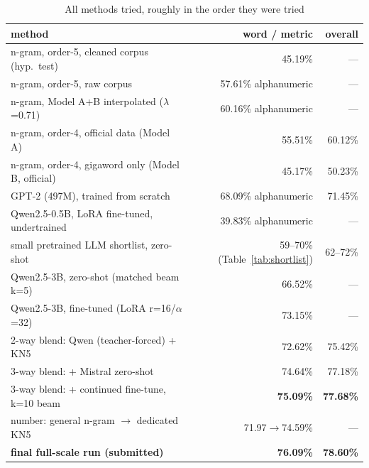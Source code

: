 \documentclass[11pt,conference]{IEEEtran}
\begin{document}
\begin{table}[p]
\centering
\large
\caption{All methods tried, roughly in the order they were tried}
\label{tab:results}
\begin{tabular}{lrr}
\toprule
method & word / metric & overall \\
\midrule
n-gram, order-5, cleaned corpus (hyp.\ test) & 45.19\% & --- \\
n-gram, order-5, raw corpus & 57.61\% alphanumeric & --- \\
n-gram, Model A+B interpolated ($\lambda$=0.71) & 60.16\% alphanumeric & --- \\
n-gram, order-4, official data (Model A) & 55.51\% & 60.12\% \\
n-gram, order-4, gigaword only (Model B, official) & 45.17\% & 50.23\% \\
GPT-2 (497M), trained from scratch & 68.09\% alphanumeric & 71.45\% \\
Qwen2.5-0.5B, LoRA fine-tuned, undertrained & 39.83\% alphanumeric & --- \\
small pretrained LLM shortlist, zero-shot & 59--70\% (Table~\ref{tab:shortlist}) & 62--72\% \\
Qwen2.5-3B, zero-shot (matched beam k=5) & 66.52\% & --- \\
Qwen2.5-3B, fine-tuned (LoRA r=16/$\alpha$=32) & 73.15\% & --- \\
2-way blend: Qwen (teacher-forced) + KN5 & 72.62\% & 75.42\% \\
3-way blend: + Mistral zero-shot & 74.64\% & 77.18\% \\
3-way blend: + continued fine-tune, k=10 beam & \textbf{75.09\%} & \textbf{77.68\%} \\
number: general n-gram $\to$ dedicated KN5 & 71.97$\to$74.59\% & --- \\
\textbf{final full-scale run (submitted)} & \textbf{76.09\%} & \textbf{78.60\%} \\
\bottomrule
\end{tabular}
\end{table}
\end{document}
